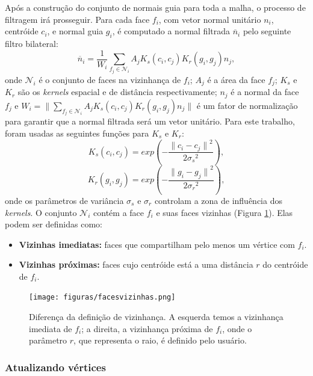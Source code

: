 Após a construção do conjunto de normais guia para toda a malha, o processo de filtragem irá prosseguir. Para cada face $f_i$, com vetor normal unitário $n_i$, centróide $c_i$, e normal guia $g_i$, é computado a normal filtrada $\overline{n}_i$ pelo seguinte filtro bilateral:
\begin{equation} \label{eq:filtrobilateraldasnormais}
    \overline{n}_i = \frac{1}{W_i}\sum_{f_j \in \mathcal{N}_i}{A_j K_s(c_i,c_j)K_r(g_i,g_j) n_j},
\end{equation}
onde $\mathcal{N}_i$ é o conjunto de faces na vizinhança de $f_i$; $A_j$ é a área da face $f_j$; \textbf{$K_s$} e \textbf{$K_r$} são os \textit{kernels} espacial e de distância respectivamente; \textbf{$n_j$} é a normal da face $f_j$ e $W_i = \|\sum_{f_j \in \mathcal{N}_i}{A_j K_s(c_i,c_j)K_r(g_i,g_j) n_j}\|$ é um fator de normalização para garantir que a normal filtrada será um vetor unitário. Para este trabalho, foram usadas as seguintes funções para \textbf{$K_s$} e \textbf{$K_r$}:
\begin{equation}
    K_s(c_i,c_j) = exp(-\frac{ {\| c_i-c_j \|}^2 }{ 2{\sigma_s}^2 }),
\end{equation}
\begin{equation}
    K_r(g_i,g_j) = exp(-\frac{ {\| g_i-g_j \|}^2 }{ 2{\sigma_r}^2 }),
\end{equation}
onde os parâmetros de variância \textbf{$\sigma_s$} e \textbf{$\sigma_r$} controlam a zona de influência dos \textit{kernels}. O conjunto $\mathcal{N}_i$ contém a face $f_i$ e suas faces vizinhas (Figura \ref{fig:facesvizinhas}). Elas podem ser definidas como:
\begin{itemize}
    \item \textbf{Vizinhas imediatas:} faces que compartilham pelo menos um vértice com $f_i$.
    \item \textbf{Vizinhas próximas:} faces cujo centróide está a uma distância $r$ do centróide de $f_i$.
\end{itemize}


\begin{figure}[!h]
\captionsetup{width=\linewidth}
\centering
\texttt{[image: figuras/facesvizinhas.png]}
\caption{Diferença da definição de vizinhança. A esquerda temos a vizinhança imediata de $f_i$; a direita, a vizinhança próxima de $f_i$, onde o parâmetro $r$, que representa o raio, é definido pelo usuário.}
\label{fig:facesvizinhas}
\end{figure}


\subsubsection{Atualizando vértices}

